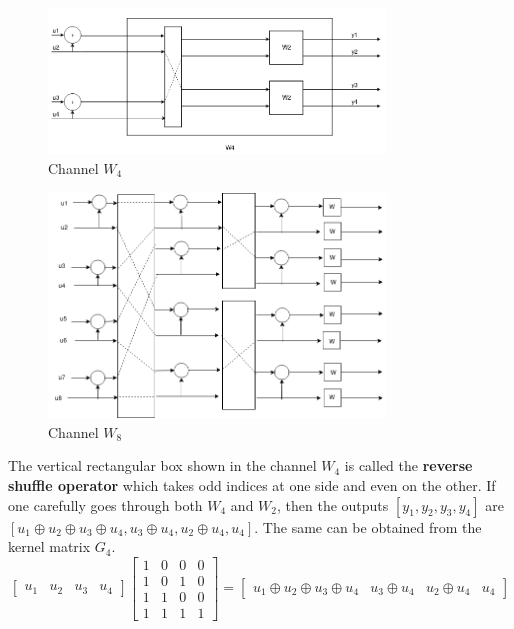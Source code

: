 \documentclass{report}
\begin{document}
\begin{figure}[H]
\centering
\includegraphics[width=0.8\textwidth, height=0.2\textheight]{w4.png}
\caption{Channel $W_{4}$}
\end{figure}
\begin{figure}[H]
\centering
\includegraphics[width=0.8\textwidth, height=0.5\textheight]{w8.png}
\caption{Channel $W_{8}$}
\end{figure}
The vertical rectangular box shown in the channel $W_{4}$ is called the \textbf{reverse shuffle operator} which takes odd indices at one side and even on the other. If one carefully goes through both $W_{4}$ and $W_{2}$, then the outputs $[y_{1}, y_{2},y_{3},y_{4}]$ are $[u_{1}\oplus u_{2} \oplus u_{3} \oplus u_{4}, u_{3} \oplus u_{4}, u_{2} \oplus u_{4}, u_{4}]$. The same can be obtained from the kernel matrix $G_{4}$.
\[
\begin{bmatrix}
u_{1} & u_{2} &u_{3}&u_{4}
\end{bmatrix}
\begin{bmatrix}
1 & 0 & 0 & 0 \\
1 & 0 & 1 & 0 \\
1 & 1 & 0 & 0 \\
1 & 1 & 1 & 1
\end{bmatrix}
=
\begin{bmatrix}
u_{1}\oplus u_{2} \oplus u_{3} \oplus u_{4} & u_{3} \oplus u_{4} &  u_{2} \oplus u_{4} & u_{4}
\end{bmatrix}
\] 
\end{document}
